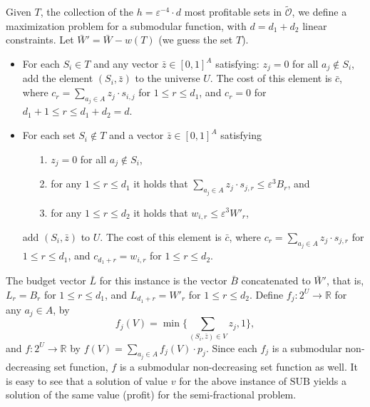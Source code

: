 \documentclass[11pt]{article}
\newcommand{\eps}{\varepsilon}
\newcommand{\bz}{\bar{z}}
\newcommand{\bL}{\bar{L}}
\newcommand{\bc}{\bar{c}}
\newcommand{\bW}{\bar{W}}
\newcommand{\bB}{\bar{B}}
\newcommand{\SUB}{\mbox{SUB}}
\newcommand{\tmO}{\tilde{\mathcal{O}}}
\begin{document}
{Given $T$, the collection of the $h=\eps^{-4} \cdot d$
most profitable sets in $\tmO$, we define a maximization
problem for a submodular function, with $d= d_1 +d_2$
linear constraints. Let $\bW' = \bW- w(T)$
(we guess the set $T$).
\begin{itemize}
\item
For each $S_i \in T$ and any vector $\bz \in [0,1]^{A}$ satisfying:
$z_j = 0$ for all $a_j \notin S_i$,
add the element
$(S_i,\bz)$ to the universe $U$. The cost of this
element is $\bc$, where $c_r= \sum_{a_j \in A} z_j \cdot
s_{i,j}$ for $1\leq r \leq d_1$,
and $c_r=0$ for $d_1+1\leq r \leq d_1+d_2=d$.
\item
For each set $S_i \notin T$ and a vector $\bz \in [0,1]^{A}$ satisfying
\begin{enumerate}
\item[1.]
$z_j = 0$ for all $a_j \notin S_i$,
\item[2.]
for any $1\leq r \leq d_1$
it holds that $\sum_{a_j \in A} z_j \cdot s_{j,r} \leq \eps^3 B_r$, and
\item[3.]
for any $1\leq r \leq d_2$ it holds that $ w_{i,r} \leq \eps^3 W'_r$,
\end{enumerate}
add  $(S_i,\bz)$ to $U$.
The cost of this element is $\bc$, where
$c_r= \sum_{a_j \in A} z_j \cdot s_{j,r}$ for $1\leq r\leq d_1$,
and $c_{d_1+r} = w_{i,r}$ for $1\leq r \leq d_2$.
\end{itemize}

The budget vector $\bL$ for this instance is the vector $\bB$
concatenated to $\bW'$,
that is, $L_r = B_r$ for $1\leq r \leq d_1$, and $L_{d_1 +r } = W'_r$
for $1\leq r \leq d_2$.
Define $f_j: 2^U \rightarrow \mathbb{R}$ for any $a_j \in A$,
by
\begin{equation}
\label{eq:def_fj}
f_j(V)= \min \{ \sum_{(S_i,\bz) \in V} z_j ,1\},
\end{equation}
and  $f: 2^U \rightarrow \mathbb{R}$  by $f(V) =\sum_{a_j \in A} f_j(V) \cdot p_j$.
Since each $f_j$ is a submodular non-decreasing set function, $f$ is
a submodular non-decreasing set function as well.
It is easy to see  that a solution of value $v$ for the above instance of
 ${\SUB}$ yields a solution of the same value (profit) for the
semi-fractional problem.

}
\end{document}
